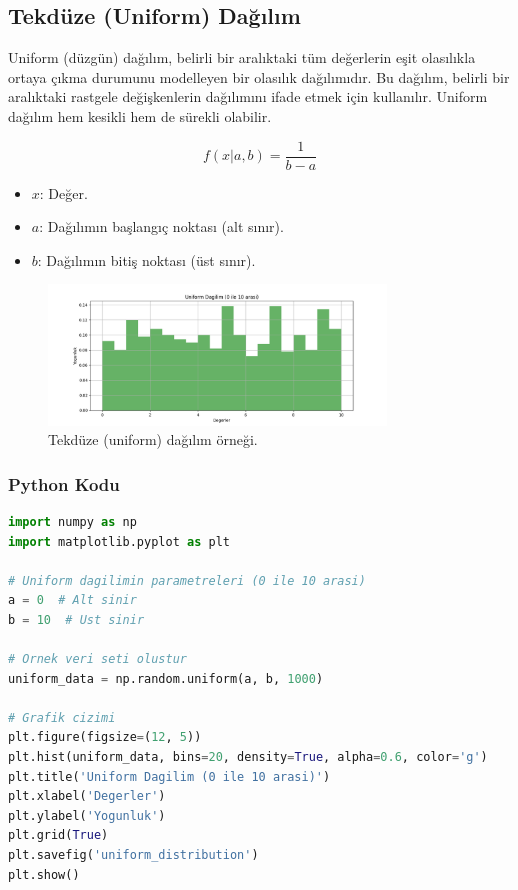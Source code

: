 \newpage

\subsection{Tekdüze (Uniform) Dağılım}
Uniform (düzgün) dağılım, belirli bir aralıktaki tüm değerlerin eşit olasılıkla ortaya çıkma durumunu modelleyen bir olasılık dağılımıdır. Bu dağılım, belirli bir aralıktaki rastgele değişkenlerin dağılımını ifade etmek için kullanılır. Uniform dağılım hem kesikli hem de sürekli olabilir.

\[f(x|a,b) = \frac{1}{b-a}\]
\begin{itemize}
	\item $x$: Değer.
	\item $a$: Dağılımın başlangıç noktası (alt sınır).
	\item $b$: Dağılımın bitiş noktası (üst sınır).
\end{itemize}

\begin{figure}[h]
    \centering
    \includegraphics[width=0.8\textwidth]{images/uniform_distribution.png}
    \caption{Tekdüze (uniform) dağılım örneği.}
    \label{fig:enter-label}
\end{figure}

\subsubsection{Python Kodu}

\begin{lstlisting}[language=Python]
import numpy as np
import matplotlib.pyplot as plt

# Uniform dagilimin parametreleri (0 ile 10 arasi)
a = 0  # Alt sinir
b = 10  # Ust sinir

# Ornek veri seti olustur
uniform_data = np.random.uniform(a, b, 1000)

# Grafik cizimi
plt.figure(figsize=(12, 5))
plt.hist(uniform_data, bins=20, density=True, alpha=0.6, color='g')
plt.title('Uniform Dagilim (0 ile 10 arasi)')
plt.xlabel('Degerler')
plt.ylabel('Yogunluk')
plt.grid(True)
plt.savefig('uniform_distribution')
plt.show()
\end{lstlisting}


